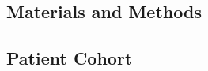 \documentclass[jpm,article,submit,moreauthors,pdftex]{Definitions/mdpi}
\begin{document}
\begin{paracol}{2}







\section{Materials and Methods} %

\subsection{Patient Cohort} 


\end{paracol}
\end{document}
